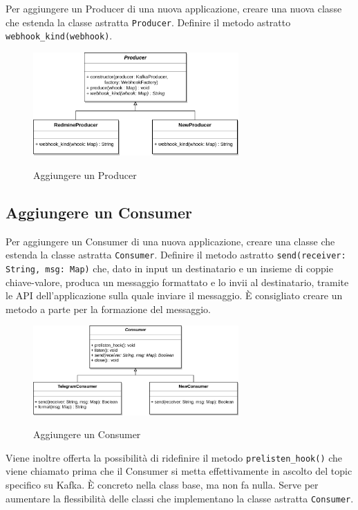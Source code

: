 Per aggiungere un Producer di una nuova applicazione, creare una nuova classe che estenda la classe astratta \texttt{Producer}.
Definire il metodo astratto \texttt{webhook\_kind(webhook)}.

\begin{figure}[H]
    \centering
    \includegraphics[width=0.7\textwidth]{img/EstensioneProducer.png}\\
    \caption{Aggiungere un Producer}
\end{figure}


\subsection{Aggiungere un Consumer}

Per aggiungere un Consumer di una nuova applicazione, creare una classe che estenda la classe astratta \texttt{Consumer}.
Definire il metodo astratto \texttt{send(receiver: String, msg: Map)} che, dato in input un destinatario e un insieme di coppie
chiave-valore, produca un messaggio formattato e lo invii al destinatario, tramite le API dell'applicazione sulla quale inviare il messaggio.
È consigliato creare un metodo a parte per la formazione del messaggio.

\begin{figure}[H]
    \centering
    \includegraphics[width=0.7\textwidth]{img/EstensioneConsumer.png}\\
    \caption{Aggiungere un Consumer}
\end{figure}

Viene inoltre offerta la possibilità di ridefinire il metodo \texttt{prelisten\_hook()} che viene chiamato prima che il Consumer si metta effettivamente in ascolto
del topic specifico su Kafka.
È concreto nella class base, ma non fa nulla. Serve per aumentare la flessibilità delle classi che implementano la classe astratta \texttt{Consumer}.


